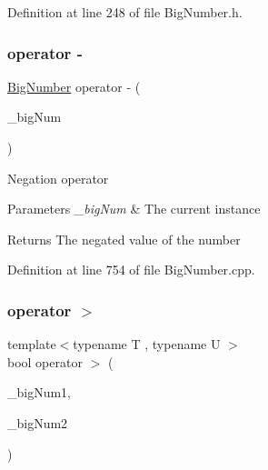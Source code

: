 Definition at line 248 of file Big\+Number.\+h.

\mbox{\label{class_big_nums_1_1_big_number_aa1017a29d47606c15545ea481c1f5dbf}} 
\subsubsection{\texorpdfstring{operator -\/}{operator -}\hspace{0.1cm}{\footnotesize\ttfamily [3/3]}}
{\footnotesize\ttfamily \mbox{\hyperlink{class_big_nums_1_1_big_number}{Big\+Number}} operator -\/ (\begin{DoxyParamCaption}\item[{const \mbox{\hyperlink{class_big_nums_1_1_big_number}{Big\+Number}} \&}]{\+\_\+big\+Num }\end{DoxyParamCaption})\hspace{0.3cm}{\ttfamily [friend]}}

Negation operator 
\begin{DoxyParams}{Parameters}
{\em \+\_\+big\+Num} & The current instance \\
\hline
\end{DoxyParams}
\begin{DoxyReturn}{Returns}
The negated value of the number 
\end{DoxyReturn}


Definition at line 754 of file Big\+Number.\+cpp.

\mbox{\label{class_big_nums_1_1_big_number_a2333d6e7a2438bcea0672fb4dbfc7b91}} 
\subsubsection{\texorpdfstring{operator $>$}{operator >}}
{\footnotesize\ttfamily template$<$typename T , typename U $>$ \\
bool operator $>$ (\begin{DoxyParamCaption}\item[{const T \&}]{\+\_\+big\+Num1,  }\item[{const U \&}]{\+\_\+big\+Num2 }\end{DoxyParamCaption})\hspace{0.3cm}{\ttfamily [friend]}}



